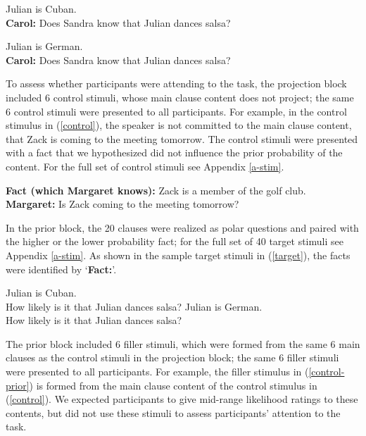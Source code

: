 \documentclass[11pt,fleqn]{article}
\newcommand{\6}{\mbox{$[\hspace*{-.6mm}[$}}
\newcommand{\9}{\mbox{$]\hspace*{-.6mm}]$}}
\begin{document}
 
\begin{exe}
\ex\label{stim}
\begin{xlist}
 Julian is Cuban.  \\ 
{\bf Carol:} Does Sandra know that Julian dances salsa?

 Julian is German.  \\ 
{\bf Carol:} Does Sandra know that Julian dances salsa?
\end{xlist}
\end{exe}
To assess whether participants were attending to the task, the projection block included 6 control stimuli, whose main clause content does not project; the same 6 control stimuli were presented to all participants. For example, in the control stimulus in (\ref{control}), the speaker is not committed to the main clause content, that Zack is coming to the meeting tomorrow. The control stimuli were presented with a fact that we hypothesized did not influence the prior probability of the content. For the full set of control stimuli see Appendix \ref{a-stim}.

\begin{exe}
\ex\label{control} {\bf Fact (which Margaret knows):}  Zack is a member of the golf club. \\ {\bf Margaret:} Is Zack coming to the meeting tomorrow?
\end{exe}

In the prior block, the 20 clauses were realized as polar questions and paired with the higher or the lower probability fact; for the full set of 40 target stimuli see Appendix \ref{a-stim}. As shown in the sample target stimuli in (\ref{target}), the facts were identified by `{\bf Fact:}'. 

\begin{exe}
\ex\label{target} 
\begin{xlist}
 Julian is Cuban. \\ How likely is it that Julian dances salsa?
 Julian is German. \\ How likely is it that Julian dances salsa?
\end{xlist}
\end{exe}
The prior block included 6 filler stimuli, which were formed from the same 6 main clauses as the control stimuli in the projection block; the same 6 filler stimuli were presented to all participants. For example, the filler stimulus in (\ref{control-prior}) is formed from the main clause content of the control stimulus in (\ref{control}). We expected participants to give mid-range likelihood ratings to these contents, but did not use these stimuli to assess participants' attention to the task.
\end{document}
